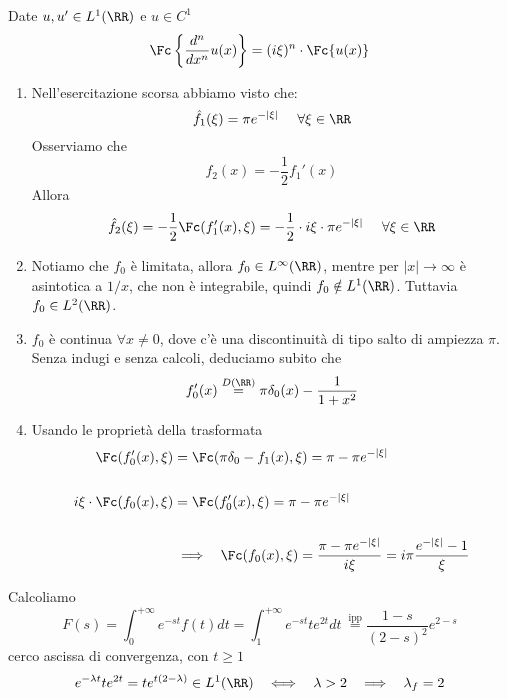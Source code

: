 \begin{thm}
 Date $u, u'\in L^{1}(\RR)$ e $u\in C^{1}$
\begin{equation*}
\Fc \left\{\frac{d^{n}}{dx^{n}} u(x)\right\} = (i\xi)^{n} \cdot \Fc \{u(x)\}
\end{equation*}
\end{thm}
\begin{enumerate}
\item Nell'esercitazione scorsa abbiamo visto che:
\begin{equation*}
\hat{f}_{1}(\xi) = \pi e^{- | \xi |} \ \ \ \ \forall \xi \in \RR
\end{equation*}Osserviamo che
\begin{equation*}
f_{2}(x) = - \frac{1}{2} f_{1}'(x)
\end{equation*}Allora
\begin{equation*}
\hat{f}_{2}(\xi) = - \frac{1}{2}\Fc (f_{1}'(x), \xi) = - \frac{1}{2} \cdot i\xi \cdot \pi e^{- | \xi |} \ \ \ \ \forall \xi \in \RR
\end{equation*}
\item Notiamo che $f_{0}$ è limitata, allora $f_{0} \in L^{\infty}(\RR)$, mentre per $| x| \rightarrow \infty $ è asintotica a $1/x$, che non è integrabile, quindi $f_{0} \notin L^{1}(\RR)$. Tuttavia $f_{0} \in L^{2}(\RR)$.
\item $f_{0}$ è continua $\forall x\neq 0$, dove c'è una discontinuità di tipo salto di ampiezza $\pi $. Senza indugi e senza calcoli, deduciamo subito che
\begin{equation*}
f_{0}'(x)\overset{D(\RR)}{=} \pi \delta_{0}(x) - \frac{1}{1 + x^{2}}
\end{equation*}
\item Usando le proprietà della trasformata
\begin{align*}
\Fc (f_{0}'(x), \xi) & = \Fc (\pi \delta_{0} - f_{1}(x), \xi) = \pi - \pi e^{- | \xi |}\\
 & \\
i\xi \cdot\Fc (f_{0}(x), \xi) & = \Fc (f_{0}'(x), \xi) = \pi - \pi e^{- | \xi |}\\
 & \\
 & \implies \ \ \Fc (f_{0}(x), \xi) = \frac{\pi - \pi e^{- | \xi |}}{i\xi} = i\pi \frac{e^{- | \xi |} - 1}{\xi}
\end{align*}
\end{enumerate}

\Soluzione

Calcoliamo
\begin{equation*}
F(s) = \int^{+ \infty}_{0} e^{- st} f(t) dt = \int^{+ \infty}_{1} e^{- st} te^{2t} dt\ \overset{\text{ipp}}{=}\frac{1 - s}{(2 - s)^{2}} e^{2 - s}
\end{equation*}
cerco ascissa di convergenza, con $t \geq 1$
\begin{equation*}
e^{- \lambda t} te^{2t} = te^{t(2 - \lambda)} \in L^{1}(\RR) \ \ \iff \ \ \lambda > 2\ \ \implies \ \ \lambda_{f} = 2
\end{equation*}

